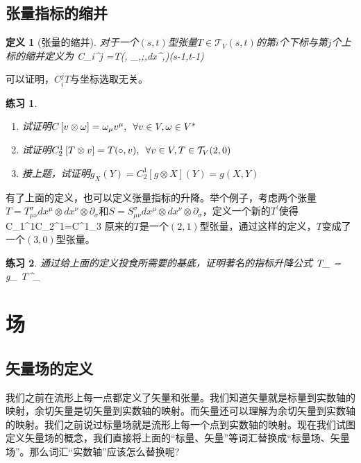 \documentclass[11pt,a4paper]{ctexbook}
\newtheorem{definition}{\hspace{2em} 定义}[section]
\newtheorem{practice}{\hspace{2em} 练习}[section]
\begin{document}
\subsection{张量指标的缩并}
\begin{definition}[张量的缩并]
  对于一个$(s,t)$型张量$T\in\mathcal{T}_V(s,t)$的第$i$个下标与第$j$个上标的缩并定义为
  \beq
  C_i^j \left[T\right]=T(\cdots, \partial_\mu,\cdots ;\cdots,dx^{\mu},\cdots)\in {}(s-1,t-1)
  \eeq
\end{definition}
可以证明，$C_i^j T$与坐标选取无关。
\begin{practice}

  \begin{enumerate}[(1)]
  \item 试证明$C\left[v\otimes \omega\right] = \omega_\mu v^{\mu},\,\,\, \forall v \in V, \omega \in V^*$
  \item 试证明$C_2^1\left[T\otimes v\right] = T(\circ,v),\,\,\, \forall v\in V, T\in \mathcal{T}_V(2,0)$
  \item 接上题，试证明$g_X(Y) = C_2^1\left[g\otimes X\right](Y) = g(X,Y)$
  \end{enumerate}
\end{practice}
有了上面的定义，也可以定义张量指标的升降。举个例子，考虑两个张量$T = T_{\mu\nu}^\sigma dx^{\mu}\otimes dx^\nu \otimes \partial_\sigma$和$S = S_{\mu\nu}^\sigma dx^{\mu}\otimes dx^\nu \otimes \partial_\sigma$，定义一个新的$T^\prime$使得
\beq
C_1^1\otimes C_2^1=C^1_3
\eeq
原来的$T$是一个$(2,1)$型张量，通过这样的定义，$T$变成了一个$(3,0)$型张量。
\begin{practice}
  通过给上面的定义投食所需要的基底，证明著名的指标升降公式
  \beq
  T_{\mu\nu\rho} = g_{\rho\sigma} T^\sigma_{\mu\nu}
  \eeq
\end{practice}

\section{场}
\subsection{矢量场的定义}
我们之前在流形上每一点都定义了矢量和张量。我们知道矢量就是标量到实数轴的映射，余切矢量是切矢量到实数轴的映射。而矢量还可以理解为余切矢量到实数轴的映射。我们之前说过标量场就是流形上每一个点到实数轴的映射。现在我们试图定义矢量场的概念，我们直接将上面的“标量、矢量”等词汇替换成“标量场、矢量场”。那么词汇“实数轴”应该怎么替换呢?
\end{document}
